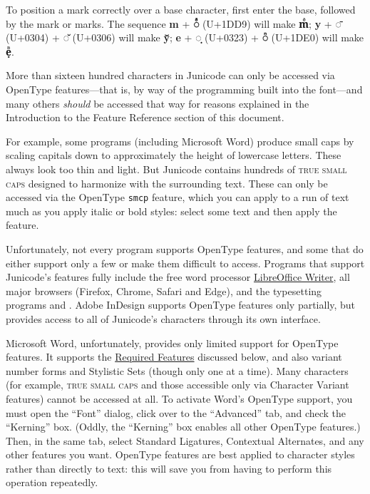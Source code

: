 \documentclass[12pt,letterpaper,openany]{book}
\newcommand\textSourceText[1]{{\color{GGOrange}\texttt{#1}}}
\newcounter{Feature}
\begin{document}
To position a mark correctly over a base character, first enter the base,
followed by the mark or marks.
The sequence \textbf{m} + \textbf{◌ᷙ} (U+1DD9)
will make \textbf{mᷙ}; \textbf{y} + \textbf{◌̄} (U+0304) + \textbf{◌̆} (U+0306) will make \textbf{ȳ̆};
\textbf{e} + \textbf{◌̣} (U+0323) + \textbf{◌ᷠ} (U+1DE0) will make \textbf{ẹᷠ}.

More than sixteen hundred characters in Junicode can only be accessed via OpenType features—that is,
by way of the programming built into the font—and many others \textit{should} be
accessed that way for reasons explained in the Introduction
to the Feature Reference section of this document.

For example, some programs (including Microsoft Word) produce small caps by
scaling capitals down to approximately the height of lowercase letters.
These always look too thin and light.
But Junicode contains hundreds of \textsc{true small caps} designed to harmonize with
the surrounding text. These can only be accessed via the OpenType \textSourceText{smcp} feature,
which you can apply to a run of text much as you apply italic or bold styles:
select some text and then apply the feature.

Unfortunately, not every program supports OpenType features, and some that do
either support only a few or make them difficult to access. Programs
that support Junicode’s features fully include the free word processor
\href{https://www.libreoffice.org/}{LibreOffice Writer}, all major browsers
(Firefox, Chrome, Safari and Edge), and
the typesetting programs {\LuaLaTeX} and {\XeLaTeX}. Adobe InDesign supports
OpenType features only partially, but provides access to all of Junicode's characters
through its own interface.

Microsoft Word, unfortunately, provides only limited support for OpenType
features. It supports the \hyperlink{req}{Required Features} discussed below, and also
variant number forms and Stylistic Sets (though only one at a time). Many characters
(for example, \textsc{true small caps} and those accessible only via Character
Variant features) cannot be accessed at all. To activate Word's OpenType
support, you must open the “Font” dialog, click over to the “Advanced” tab,
and check the “Kerning” box. (Oddly, the “Kerning” box enables all other
OpenType features.) Then, in the same tab, select Standard Ligatures, Contextual
Alternates, and any other features you want.
OpenType features are best applied to character styles rather than
directly to text: this will
save you from having to perform this operation repeatedly.
\end{document}
